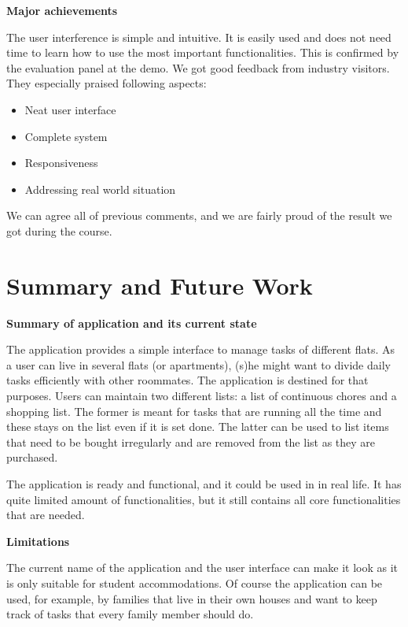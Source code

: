 \documentclass{sig-alt-release2}
\begin{document}
\vspace{5 mm} \noindent \textbf{Major achievements}

The user interference is simple and intuitive. It is easily used and does not
need time to learn how to use the most important functionalities. This is
confirmed by the evaluation panel at the demo. We got good feedback
from industry visitors. They especially praised following aspects:
\begin{itemize}
\item Neat user interface
\item Complete system
\item Responsiveness
\item Addressing real world situation
\end{itemize}
We can agree all of previous comments, and we are fairly proud of the result we
got during the course.

\section{Summary and Future Work}

\vspace{5 mm} \noindent \textbf{Summary of application and its current state}

The application provides a simple interface to manage tasks of different flats.
As a user can live in several flats (or apartments), (s)he might want to divide
daily tasks efficiently with other roommates. The application is destined for
that purposes. Users can maintain two different lists: a list of continuous
chores and a shopping list. The former is meant for tasks that are running all
the time and these stays on the list even if it is set done. The latter can be
used to list items that need to be bought irregularly and are removed from the
list as they are purchased.

The application is ready and functional, and it could be used in in real life.
It has quite limited amount of functionalities, but it still contains all core
functionalities that are needed.

\vspace{5 mm} \noindent \textbf{Limitations}

The current name of the application and the user interface can make it look as
it is only suitable for student accommodations. Of course the application can be
used, for example, by families that live in their own houses and want to keep
track of tasks that every family member should do.
\end{document}
